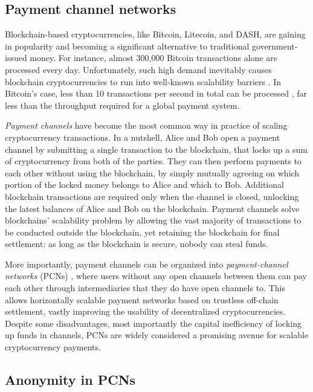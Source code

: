 \documentclass[USenglish,oneside,twocolumn]{article}
\begin{document}
\subsection{Payment channel networks}

Blockchain-based cryptocurrencies, like Bitcoin, Litecoin, and DASH, are gaining in popularity and becoming a significant alternative to traditional government-issued money. For instance, almost 300,000 Bitcoin transactions alone \cite{bccom} are processed every day. Unfortunately, such high demand inevitably causes blockchain cryptocurrencies to run into well-known scalability barriers \cite{croman2016scaling}. In Bitcoin's case, less than 10 transactions per second in total can be processed \cite{mccorry2016towards}, far less than the throughput required for a global payment system.

\emph{Payment channels} \cite{decker2015fast} have become the most common way in practice of scaling cryptocurrency transactions. In a nutshell, Alice and Bob open a payment channel by submitting a single transaction to the blockchain, that locks up a sum of cryptocurrency from both of the parties. They can then perform payments to each other without using the blockchain, by simply mutually agreeing on which portion of the locked money belongs to Alice and which to Bob. Additional blockchain transactions are required only when the channel is closed, unlocking the latest balances of Alice and Bob on the blockchain. Payment channels solve blockchains' scalability problem by allowing the vast majority of transactions to be conducted outside the blockchain, yet retaining the blockchain for final settlement: as long as the blockchain is secure, nobody can steal funds.

More importantly, payment channels can be organized into \emph{payment-channel networks} (PCNs) \cite{mccorry2016towards}, where users without any open channels between them can pay each other through intermediaries that they do have open channels to. This allows horizontally scalable payment networks based on trustless off-chain settlement, vastly improving the usability of decentralized cryptocurrencies. Despite some disadvantages, most importantly the capital inefficiency of locking up funds in channels, PCNs are widely considered a promising avenue for scalable cryptocurrency payments.

\subsection{Anonymity in PCNs}
\end{document}
